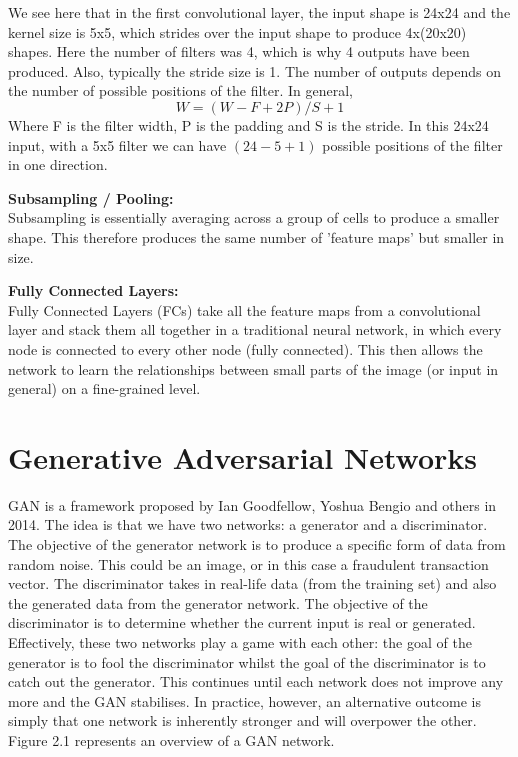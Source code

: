 \documentclass[12pt,a4paper,twoside]{report}
\begin{document}
We see here that in the first convolutional layer, the input shape is 24x24 and the kernel size is 5x5, which strides over the input shape to produce 4x(20x20) shapes. Here the number of filters was 4, which is why 4 outputs have been produced. Also, typically the stride size is 1. The number of outputs depends on the number of possible positions of the filter. In general, $$W=(W-F+2P)/S+1$$ Where F is the filter width, P is the padding and S is the stride. In this 24x24 input, with a 5x5 filter we can have $(24-5+1)$ possible positions of the filter in one direction. 

\textbf{Subsampling / Pooling:}\\
Subsampling is essentially averaging across a group of cells to produce a smaller shape. This therefore produces the same number of 'feature maps' but smaller in size. 

\textbf{Fully Connected Layers:}\\
Fully Connected Layers (FCs) take all the feature maps from a convolutional layer and stack them all together in a traditional neural network, in which every node is connected to every other node (fully connected). This then allows the network to learn the relationships between small parts of the image (or input in general) on a fine-grained level. 


\section{Generative Adversarial Networks}
GAN is a framework proposed by Ian Goodfellow, Yoshua Bengio and others in 2014\cite{2014arXiv1406.2661G}. The idea is that we have two networks: a generator and a discriminator. The objective of the generator network is to produce a specific form of data from random noise. This could be an image, or in this case a fraudulent transaction vector. The discriminator takes in real-life data (from the training set) and also the generated data from the generator network. The objective of the discriminator is to determine whether the current input is real or generated. Effectively, these two networks play a game with each other: the goal of the generator is to fool the discriminator whilst the goal of the discriminator is to catch out the generator. This continues until each network does not improve any more and the GAN stabilises. In practice, however, an alternative outcome is simply that one network is inherently stronger and will overpower the other. Figure 2.1 represents an overview of a GAN network.
\end{document}
